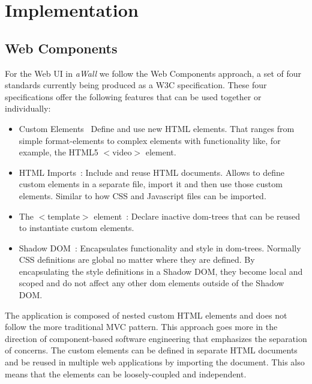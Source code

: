 \documentclass{sigchi}
\begin{document}
\section{Implementation}

\subsection{Web Components}
For the Web UI in \textit{aWall} we follow the Web Components  \cite{webcomponents.org} approach,  a set of four standards currently being produced as a W3C specification.
These four specifications offer the following features that can be used together or individually:
\begin{itemize}
	\item Custom Elements~\cite{CustomElements} Define and use new HTML elements. 
	That ranges from simple format-elements to complex elements with functionality like, for example, the HTML5 $<$video$>$ element.
	
	\item HTML Imports~\cite{HTMLImports}: Include and reuse HTML documents.
	Allows to define custom elements in a separate file,  import it and then use those custom elements. 
	Similar to how CSS and Javascript files can be imported.
	
	\item The $<$template$>$ element~\cite{TemplateElement}: Declare inactive \gls{dom}-trees that can be reused to instantiate custom elements.
	
	\item Shadow DOM~\cite{ShadowDOM}: Encapsulates functionality and style in \gls{dom}-trees.
	Normally CSS definitions are global no matter where they are defined.
	By encapsulating the style definitions in a Shadow DOM, they become local and scoped and do not affect any other \gls{dom} elements outside of the Shadow DOM.
\end{itemize}

The application is composed of nested custom HTML elements and does not follow the more traditional MVC pattern. 
This approach goes more in the direction of component-based software engineering that emphasizes the separation of concerns.
The custom elements can be defined in separate HTML documents and be reused in multiple web applications by importing the document.
This also means that the elements can be loosely-coupled and independent.
\end{document}
